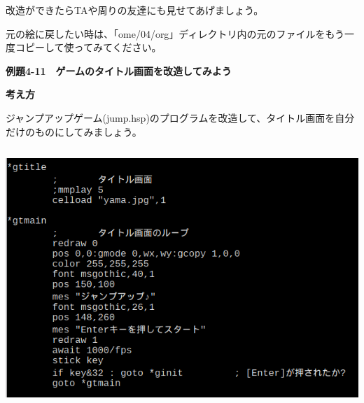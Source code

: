 \documentclass[a4paper,dvipdfmx]{jarticle}
\newcommand\textstyleqwerty[1]{#1}
\begin{document}
\bigskip

改造ができたらTAや周りの友達にも見せてあげましょう。


\bigskip

元の絵に戻したい時は、「ome/04/org」ディレクトリ内の元のファイルをもう一度コピーして使ってみてください。


\bigskip


\bigskip

\clearpage
\textstyleqwerty{\textbf{例題4-11　ゲームのタイトル画面を改造してみよう}}


\bigskip

{\bfseries
考え方}


\bigskip

ジャンプアップゲーム(jump.hsp)のプログラムを改造して、タイトル画面を自分だけのものにしてみましょう。


\bigskip



\begin{center}
\includegraphics[width=14.42cm,height=9.791cm]{text04-img/text04-img033.png}

\end{center}

\bigskip


\bigskip


\bigskip


\bigskip


\bigskip


\bigskip


\bigskip


\bigskip


\bigskip
\end{document}

